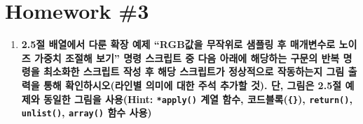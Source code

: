 \documentclass[
  11pt,
]{krantz}
\providecommand{\tightlist}{%
  \setlength{\itemsep}{0pt}\setlength{\parskip}{0pt}}
\begin{document}
\normalsize

\hypertarget{homework-3}{%
\section{Homework \#3}\label{homework-3}}

\begin{enumerate}
\def\labelenumi{\arabic{enumi}.}
\tightlist
\item
  \textbf{2.5절 배열에서 다룬 확장 예제 ``RGB값을 무작위로 샘플링 후 매개변수로 노이즈 가중치 조절해 보기'' 명령 스크립트 중 다음 아래에 해당하는 구문의 반복 명령을 최소화한 스크립트 작성 후 해당 스크립트가 정상적으로 작동하는지 그림 출력을 통해 확인하시오(라인별 의미에 대한 주석 추가할 것). 단, 그림은 2.5절 예제와 동일한 그림을 사용(Hint: \texttt{*apply()} 계열 함수, 코드블록(\texttt{\{\}}), \texttt{return()}, \texttt{unlist()}, \texttt{array()} 함수 사용)}
\end{enumerate}

\footnotesize
\end{document}
